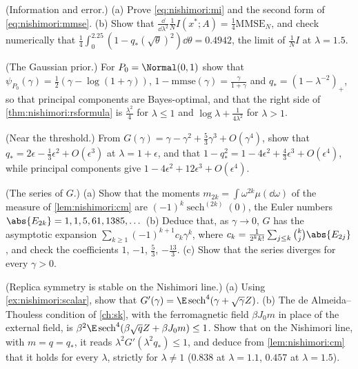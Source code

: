 \begin{refsection}
\begin{exercises}
\item \consolidation (Information and error.) (a) Prove \eqref{eq:nishimori:mi} and the second form of \eqref{eq:nishimori:mmse}. (b) Show that $\frac{\dd}{\dd\lambda^2}\frac1NI(x^*;A)=\frac14\mathrm{MMSE}_N$, and check numerically that $\frac14\int_0^{2.25}(1-q_*(\sqrt\theta)^2)\dd\theta=0.4942$, the limit of $\frac1NI$ at $\lambda=1.5$.\label{ex:nishimori:immse}

\item \consolidation (The Gaussian prior.) For $P_0=\Normal(0,1)$ show that $\psi_{P_0}(\gamma)=\frac12(\gamma-\log(1+\gamma))$, $1-\mathrm{mmse}(\gamma)=\frac\gamma{1+\gamma}$ and $q_*=(1-\lambda^{-2})_+$, so that principal components are Bayes-optimal, and that the right side of \cref{thm:nishimori:rsformula} is $\frac{\lambda^2}4$ for $\lambda\le1$ and $\log\lambda+\frac1{4\lambda^2}$ for $\lambda>1$.\label{ex:nishimori:gaussian}

\item \consolidation (Near the threshold.) From $G(\gamma)=\gamma-\gamma^2+\frac53\gamma^3+O(\gamma^4)$, show that $q_*=2\epsilon-\frac13\epsilon^2+O(\epsilon^3)$ at $\lambda=1+\epsilon$, and that $1-q_*^2=1-4\epsilon^2+\frac43\epsilon^3+O(\epsilon^4)$, while principal components give $1-4\epsilon^2+12\epsilon^3+O(\epsilon^4)$.\label{ex:nishimori:threshold}

\item \byhand (The series of $G$.) (a) Show that the moments $m_{2k}=\int\omega^{2k}\mu(\dd\omega)$ of the measure of \cref{lem:nishimori:cm} are $(-1)^k\operatorname{sech}^{(2k)}(0)$, the Euler numbers $\abs{E_{2k}}=1,1,5,61,1385,\dots$ (b) Deduce that, as $\gamma\to0$, $G$ has the asymptotic expansion $\sum_{k\ge1}(-1)^{k+1}c_k\gamma^k$, where $c_k=\frac1{2^kk!}\sum_{j\le k}\binom kj\abs{E_{2j}}$, and check the coefficients $1$, $-1$, $\frac53$, $-\frac{13}3$. (c) Show that the series diverges for every $\gamma>0$. \label{ex:nishimori:series}

\item \byhand (Replica symmetry is stable on the Nishimori line.) (a) Using \cref{ex:nishimori:scalar}, show that $G'(\gamma)=\E\operatorname{sech}^4(\gamma+\sqrt\gamma Z)$. (b) The de Almeida--Thouless condition of \cref{ch:sk}, with the ferromagnetic field $\beta J_0m$ in place of the external field, is $\beta^2\E\operatorname{sech}^4(\beta\sqrt qZ+\beta J_0m)\le1$. Show that on the Nishimori line, with $m=q=q_*$, it reads $\lambda^2G'(\lambda^2q_*)\le1$, and deduce from \cref{lem:nishimori:cm} that it holds for every $\lambda$, strictly for $\lambda\ne1$ ($0.838$ at $\lambda=1.1$, $0.457$ at $\lambda=1.5$).\label{ex:nishimori:at}


\end{exercises}
\end{refsection}
